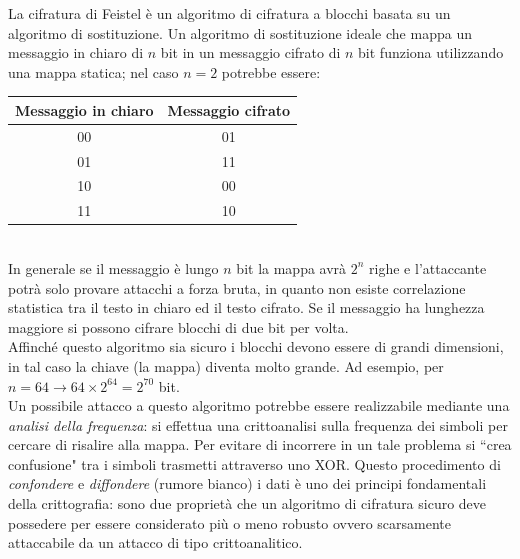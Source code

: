La cifratura di Feistel è un algoritmo di cifratura a blocchi basata su un algoritmo di sostituzione. Un algoritmo di sostituzione ideale che mappa un messaggio in chiaro di $n$ bit in un messaggio cifrato di $n$ bit funziona utilizzando una mappa statica; nel caso $n=2$ potrebbe essere:
\begin{table}[h]
	\centering
	\begin{tabular}{c|c}
		\toprule[0.5ex]
		Messaggio in chiaro & Messaggio cifrato \\
		\midrule
		00 & 01 \\
		01 & 11 \\
		10 & 00 \\
		11 & 10 \\
		\bottomrule[0.5ex]
	\end{tabular}
\end{table}\\
In generale se il messaggio è lungo $n$ bit la mappa avrà $2^n$ righe e l'attaccante potrà solo provare attacchi a forza bruta, in quanto non esiste correlazione statistica tra il testo in chiaro ed il testo cifrato. Se il messaggio ha lunghezza maggiore si possono cifrare blocchi di due bit per volta.\\
Affinché questo algoritmo sia sicuro i blocchi devono essere di grandi dimensioni, in tal caso la chiave (la mappa) diventa molto grande. Ad esempio, per $n=64 \to 64 \times 2^{64} = 2^{70}$ bit.\\
Un possibile attacco a questo algoritmo potrebbe essere realizzabile mediante una \textit{analisi della frequenza}: si effettua una crittoanalisi sulla frequenza dei simboli per cercare di risalire alla mappa. Per evitare di incorrere in un tale problema si \textquotedblleft crea confusione" tra i simboli trasmetti attraverso uno XOR. Questo procedimento di \textit{confondere} e \textit{diffondere} (rumore bianco) i dati è uno dei principi fondamentali della crittografia: sono due proprietà che un algoritmo di cifratura sicuro deve possedere per essere considerato più o meno robusto ovvero scarsamente attaccabile da un attacco di tipo crittoanalitico.
